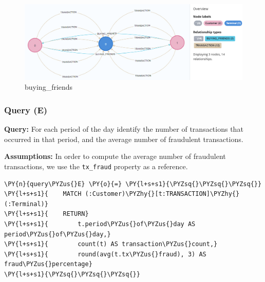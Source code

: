     

    \begin{figure}
\centering
\includegraphics{images/buying-friends.png}
\caption{buying\_friends}
\end{figure}

    \hypertarget{query-e}{%
\subsubsection{Query (E)}\label{query-e}}

    \textbf{Query:} For each period of the day identify the number of
transactions that occurred in that period, and the average number of
fraudulent transactions.

\textbf{Assumptions:} In order to compute the average number of
fraudulent transactions, we use the \texttt{tx\_fraud} property as a
reference.

    \begin{tcolorbox}[breakable, size=fbox, boxrule=1pt, pad at break*=1mm,colback=cellbackground, colframe=cellborder]
\begin{Verbatim}[commandchars=\\\{\}]
\PY{n}{query\PYZus{}E} \PY{o}{=} \PY{l+s+s1}{\PYZsq{}\PYZsq{}\PYZsq{}}
\PY{l+s+s1}{    MATCH (:Customer)\PYZhy{}[t:TRANSACTION]\PYZhy{}(:Terminal)}
\PY{l+s+s1}{    RETURN}
\PY{l+s+s1}{        t.period\PYZus{}of\PYZus{}day AS period\PYZus{}of\PYZus{}day,}
\PY{l+s+s1}{        count(t) AS transaction\PYZus{}count,}
\PY{l+s+s1}{        round(avg(t.tx\PYZus{}fraud), 3) AS fraud\PYZus{}percentage}
\PY{l+s+s1}{\PYZsq{}\PYZsq{}\PYZsq{}}
\end{Verbatim}
\end{tcolorbox}

